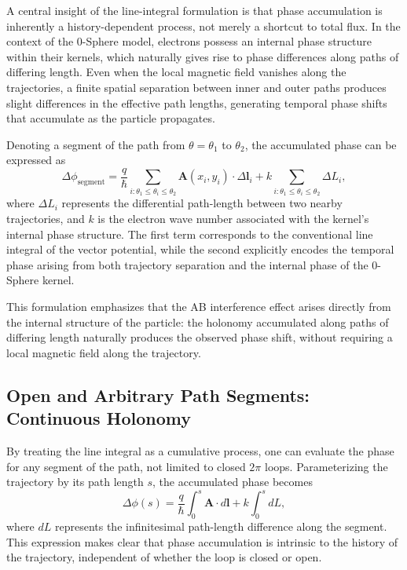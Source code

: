 \documentclass[%
 reprint,
 amsmath,amssymb,
 aps,
 prb,
]{revtex4-2}
\numberwithin{equation}{section}
\begin{document}
A central insight of the line-integral formulation is that phase accumulation is inherently a history-dependent process, not merely a shortcut to total flux. In the context of the 0-Sphere model, electrons possess an internal phase structure within their kernels, which naturally gives rise to phase differences along paths of differing length. Even when the local magnetic field vanishes along the trajectories, a finite spatial separation between inner and outer paths produces slight differences in the effective path lengths, generating temporal phase shifts that accumulate as the particle propagates.

Denoting a segment of the path from $\theta = \theta_1$ to $\theta_2$, the accumulated phase can be expressed as
\begin{equation}
\Delta \phi_\mathrm{segment} = \frac{q}{\hbar} \sum_{i:\theta_1 \le \theta_i \le \theta_2} \mathbf{A}(x_i,y_i) \cdot \Delta \mathbf{l}_i + k \sum_{i:\theta_1 \le \theta_i \le \theta_2} \Delta L_i,
\label{eq:ab_partial_phase_pathdiff}
\end{equation}
where $\Delta L_i$ represents the differential path-length between two nearby trajectories, and $k$ is the electron wave number associated with the kernel's internal phase structure. The first term corresponds to the conventional line integral of the vector potential, while the second explicitly encodes the temporal phase arising from both trajectory separation and the internal phase of the 0-Sphere kernel.

This formulation emphasizes that the AB interference effect arises directly from the internal structure of the particle: the holonomy accumulated along paths of differing length naturally produces the observed phase shift, without requiring a local magnetic field along the trajectory.


\subsection{Open and Arbitrary Path Segments: Continuous Holonomy}
\label{sec:ab_continuous_holonomy}

By treating the line integral as a cumulative process, one can evaluate the phase for any segment of the path, not limited to closed $2\pi$ loops. Parameterizing the trajectory by its path length $s$, the accumulated phase becomes
\begin{equation}
\Delta \phi(s) = \frac{q}{\hbar} \int_0^s \mathbf{A} \cdot d\mathbf{l} + k \int_0^s dL,
\end{equation}
where $dL$ represents the infinitesimal path-length difference along the segment. This expression makes clear that phase accumulation is intrinsic to the history of the trajectory, independent of whether the loop is closed or open.
\end{document}
